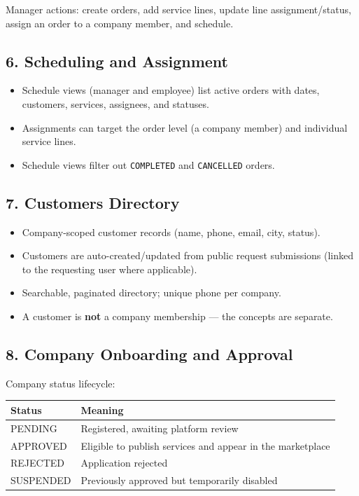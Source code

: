 \documentclass[11pt,a4paper]{article}
\begin{document}
Manager actions: create orders, add service lines, update line assignment/status, assign an order to a company member, and schedule.

\subsection{6. Scheduling and Assignment}
\label{sec:schedule}

\begin{itemize}[leftmargin=2em, itemsep=2pt]
  \item Schedule views (manager and employee) list active orders with dates, customers, services, assignees, and statuses.
  \item Assignments can target the order level (a company member) and individual service lines.
  \item Schedule views filter out \texttt{COMPLETED} and \texttt{CANCELLED} orders.
\end{itemize}

\subsection{7. Customers Directory}
\label{sec:customers}

\begin{itemize}[leftmargin=2em, itemsep=2pt]
  \item Company-scoped customer records (name, phone, email, city, status).
  \item Customers are auto-created/updated from public request submissions (linked to the requesting user where applicable).
  \item Searchable, paginated directory; unique phone per company.
  \item A customer is \textbf{not} a company membership --- the concepts are separate.
\end{itemize}

\subsection{8. Company Onboarding and Approval}
\label{sec:companies}

Company status lifecycle:

\begin{longtable}{@{}L{3.2cm}L{11.2cm}@{}}
  \toprule
  \textbf{Status} & \textbf{Meaning} \\
  \midrule
  \endhead
  PENDING & Registered, awaiting platform review \\
  APPROVED & Eligible to publish services and appear in the marketplace \\
  REJECTED & Application rejected \\
  SUSPENDED & Previously approved but temporarily disabled \\
  \bottomrule
\end{longtable}
\end{document}
